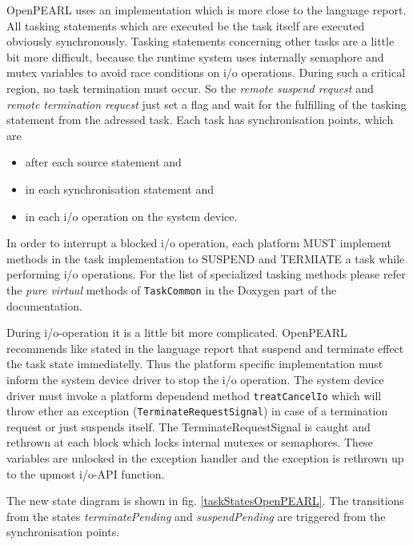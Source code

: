 OpenPEARL uses an implementation which is more close to the language report.
All tasking statements which are executed be the task itself are executed 
obviously synchronously.
Tasking statements concerning other tasks are a little 
bit more difficult, because the runtime system uses internally semaphore
 and mutex
variables to avoid race conditions on i/o operations.
During such a critical region,
no task termination must occur. So the  {\em remote suspend request} and 
{\em remote termination request} just set a flag and wait for the fulfilling
 of the 
tasking statement from the adressed task. Each task has synchronisation points,
which are
\begin{itemize}
\item  after each source statement and
\item  in each synchronisation statement and 
\item in each i/o operation on the system device.
\end{itemize}
In order to interrupt a blocked i/o operation, each platform MUST implement 
methods in the task implementation to SUSPEND and TERMIATE a task while 
performing i/o operations.
For the list of specialized tasking methods please refer the
{\em pure virtual} methods of \verb|TaskCommon| in the Doxygen
part of the documentation.

During i/o-operation it is a little bit more complicated. OpenPEARL
recommends like stated in the language report that suspend and terminate
effect the task state immediatelly. Thus the platform specific implementation
must inform the system device driver to stop the i/o operation.
The system device driver must invoke a platform dependend method
\verb|treatCancelIo| which will throw ether an exception
(\verb|TerminateRequestSignal|) in case of a termination request
 or just suspends itself.
The TerminateRequestSignal is caught and rethrown at each block which 
locks internal mutexes or semaphores. These variables are unlocked in
the exception handler and the exception is rethrown up to the upmost i/o-API
function.

The new state diagram is shown in 
fig. \ref{taskStatesOpenPEARL}.
The transitions from the  states {\em terminatePending} and 
{\em suspendPending}  are triggered from the synchronisation points.

